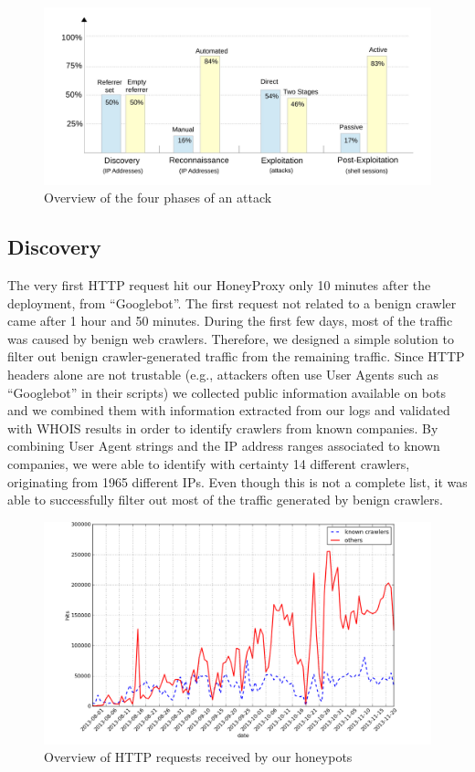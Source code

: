 \begin{figure}[tbh]
\centerline{\includegraphics[scale=0.4]{Images/overview_phases.jpg}}
\caption{Overview of the four phases of an attack\label{fig:overview_phases}}
\end{figure}

\subsection{Discovery}
The very first HTTP request hit our HoneyProxy only 10 minutes after the deployment, from ``Googlebot''. The first request not related to a benign crawler came after 1 hour and 50 minutes.
During the first few days, most of the traffic was caused by benign web crawlers. Therefore, we designed a simple solution to filter out benign crawler-generated traffic from the remaining traffic. Since HTTP headers alone are not trustable (e.g., attackers often use User Agents such as ``Googlebot'' in their scripts) we collected public information available on bots and we combined them with information extracted from our logs and validated with WHOIS results in order to identify crawlers from known companies. By combining User Agent strings and the IP address ranges associated to known companies, we were able to identify with certainty 14 different crawlers, originating from 1965 different IPs. Even though this is not a complete list, it was able to successfully filter out most of the traffic generated by benign crawlers.

\begin{figure}[tbh]
\centerline{\includegraphics[scale=0.4]{Images/requestsCrawlers.png}}
\caption{Overview of HTTP requests received by our honeypots\label{fig:requestsCrawlers}}
\end{figure}

